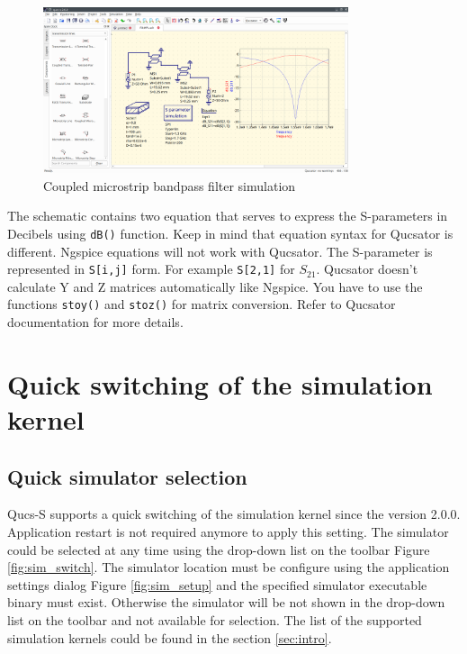 \documentclass[a4paper,12pt]{article}
\begin{document}
    \begin{figure}[!ht]
    \begin{center}
        \includegraphics[width=0.8\textwidth]{img/filt_mlin.png}
    \end{center}
    \caption{Coupled microstrip bandpass filter simulation} \label{fig:mlin}
    \end{figure}
    
The schematic contains two equation that serves to express the S-parameters in Decibels using \verb|dB()| function. Keep in mind that equation syntax for Qucsator is different. Ngspice equations will not work with Qucsator. The S-parameter is represented in \verb|S[i,j]| form. For example \verb|S[2,1]| for $S_{21}$. Qucsator doesn't calculate Y and Z matrices automatically like Ngspice. You have to use the functions \verb|stoy()| and \verb|stoz()| for matrix conversion. Refer to Qucsator documentation for more details.
    
\section{Quick switching of the simulation kernel} \label{sec:quick_sw}

\subsection{Quick simulator selection}

Qucs-S supports a quick switching of the simulation kernel since the version 2.0.0. Application restart is not required anymore to apply this setting. The simulator could be selected at any time using the drop-down list on the toolbar Figure \ref{fig:sim_switch}. The simulator location must be configure using the application settings dialog Figure \ref{fig:sim_setup} and the specified simulator executable binary must exist. Otherwise the simulator will be not shown in the drop-down list on the toolbar and not available for selection. The list of the supported simulation kernels could be found in the section \ref{sec:intro}.
\end{document}
